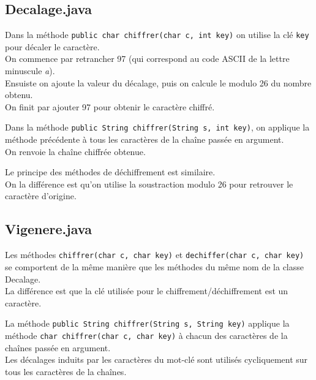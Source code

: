 \documentclass{article}
\begin{document}
\subsection{Decalage.java}
\vspace{1\baselineskip}

Dans la méthode \texttt{public char chiffrer(char c, int key)} on utilise la clé \texttt{key} pour décaler le caractère. \\
On commence par retrancher 97 (qui correspond au code ASCII de la lettre minuscule \textit{a}). \\
Ensuiste on ajoute la valeur du décalage, puis on calcule le modulo 26 du nombre obtenu. \\
On finit par ajouter 97 pour obtenir le caractère chiffré. \\
\vspace{1\baselineskip}

Dans la méthode \texttt{public String chiffrer(String s, int key)}, on applique la méthode précédente à tous les caractères de la chaîne passée en argument. \\
On renvoie la chaîne chiffrée obtenue. \\
\vspace{1\baselineskip}

Le principe des méthodes de déchiffrement est similaire. \\
On la différence est qu'on utilise la soustraction modulo 26 pour retrouver le caractère d'origine. \\
\vspace{2\baselineskip}

\subsection{Vigenere.java}
\vspace{1\baselineskip}

Les méthodes \texttt{chiffrer(char c, char key)} et \texttt{dechiffer(char c, char key)} se comportent de la même manière que les méthodes du même nom de la classe Decalage. \\
La différence est que la clé utilisée pour le chiffrement/déchiffrement est un caractère. \\
\vspace{1\baselineskip}

La méthode \texttt{public String chiffrer(String s, String key)} applique la méthode \texttt{char chiffrer(char c, char key)} à chacun des caractères de la chaînes passée en argument. \\
Les décalages induits par les caractères du mot-clé sont utilisés cycliquement sur tous les caractères de la chaînes. \\
\vspace{1\baselineskip}
\end{document}
